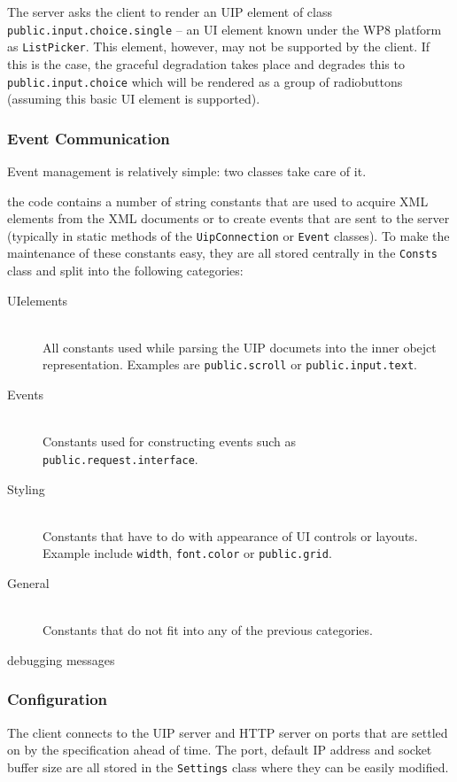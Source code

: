 The server asks the client to render an UIP element of class \texttt{public.input.choice.single} – an UI element known under the WP8 platform as \texttt{ListPicker}. This element, however, may not be supported by the client. If this is the case, the graceful degradation takes place and degrades this to \texttt{public.input.choice} which will be rendered as a group of radiobuttons (assuming this basic UI element is supported).

\subsubsection{Event Communication}
Event management is relatively simple: two classes take care of it.

the code contains a number of string constants that are used to acquire XML elements from the XML documents or to create events that are sent to the server (typically in static methods of the \texttt{UipConnection} or \texttt{Event} classes). To make the maintenance of these constants easy, they are all stored centrally in the \texttt{Consts} class and split into the following categories:

\begin{description}
  \item[UIelements] \hfill \\
  All constants used while parsing the UIP documets into the inner obejct representation. Examples are \texttt{public.scroll} or \texttt{public.input.text}.
    \item[Events] \hfill \\
    Constants used for constructing events such as \texttt{public.request.interface}.
        \item[Styling] \hfill \\
    Constants that have to do with appearance of UI controls or layouts. Example include \texttt{width}, \texttt{font.color} or \texttt{public.grid}.
    \item[General] \hfill \\
  Constants that do not fit into any of the previous categories.
\end{description}

debugging messages

\subsubsection{Configuration}
The client connects to the UIP server and HTTP server on ports that are settled on by the specification ahead of time. The port, default IP address and socket buffer size are all stored in the \texttt{Settings} class where they can be easily modified.

